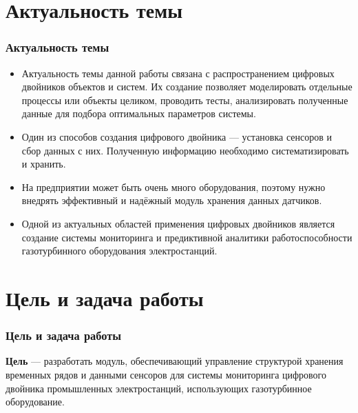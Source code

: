 \documentclass[pdf, hyperref={unicode}, aspectratio=169]{beamer}
\begin{document}

{
	\frame{\titlepage}
}


\section{Актуальность темы}
\begin{frame}
	\frametitle{Актуальность темы}
	\begin{itemize}
		\item Актуальность темы данной работы связана с распространением цифровых двойников объектов и систем. Их создание позволяет моделировать отдельные процессы или объекты целиком, проводить тесты, анализировать полученные данные для подбора оптимальных параметров системы.
		\item Один из способов создания цифрового двойника --- установка сенсоров и сбор данных с них. Полученную информацию необходимо систематизировать и хранить.
		\item На предприятии может быть очень много оборудования, поэтому нужно внедрять эффективный и надёжный модуль хранения данных датчиков.
		\item Одной из актуальных областей применения цифровых двойников является создание системы мониторинга и предиктивной аналитики работоспособности газотурбинного оборудования электростанций.
	\end{itemize}
\end{frame}


\section{Цель и задача работы}
\begin{frame}
	\frametitle{Цель и задача работы}
	
	\textbf{Цель} --- разработать модуль, обеспечивающий управление структурой хранения временных рядов и данными сенсоров для системы мониторинга цифрового двойника промышленных электростанций, использующих газотурбинное оборудование.
\end{frame}
\end{document}
